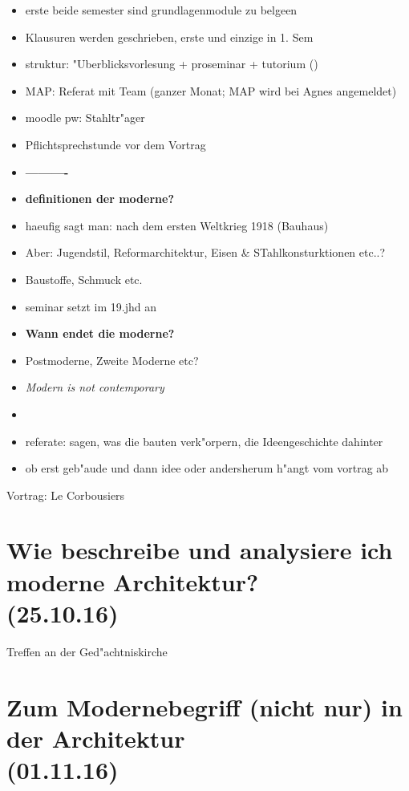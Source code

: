 \documentclass[]{scrartcl}
\begin{document}
\begin{itemize}
    \item erste beide semester sind grundlagenmodule zu belgeen
    \item Klausuren werden geschrieben, erste und einzige in 1. Sem
    \item struktur: "Uberblicksvorlesung + proseminar + tutorium ()
    \item MAP: Referat mit Team (ganzer Monat; MAP wird bei Agnes angemeldet)
    \item moodle pw: Stahltr"ager
    \item Pflichtsprechstunde vor dem Vortrag
    \item \textbf{----------}
    \item \textbf{definitionen der moderne?} 
    \item haeufig sagt man: nach dem ersten Weltkrieg 1918 (Bauhaus)
    \item Aber: Jugendstil, Reformarchitektur, Eisen \& STahlkonsturktionen etc..?
    \item Baustoffe, Schmuck etc.
    \item seminar setzt im 19.jhd an
    \item \textbf{Wann endet die moderne?}
    \item Postmoderne, Zweite Moderne etc?
    \item \emph{Modern is not contemporary}
    \item 
    \item referate: sagen, was die bauten verk"orpern, die Ideengeschichte dahinter
    \item ob erst geb"aude und dann idee oder andersherum h"angt vom vortrag ab
\end{itemize}

Vortrag: Le Corbousiers


\section{Wie beschreibe und analysiere ich moderne Architektur?\\(25.10.16)}

Treffen an der Ged"achtniskirche


\section{Zum Modernebegriff (nicht nur) in der Architektur\\(01.11.16)}
\end{document}
